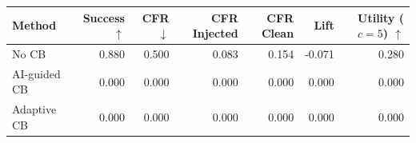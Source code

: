 \begin{tabular}{lrrrrrr}
\toprule
Method & Success $\uparrow$ & CFR $\downarrow$ & CFR Injected & CFR Clean & Lift & Utility ($c=5$) $\uparrow$ \\
\midrule
No CB & 0.880 & 0.500 & 0.083 & 0.154 & -0.071 & 0.280 \\
AI-guided CB & 0.000 & 0.000 & 0.000 & 0.000 & 0.000 & 0.000 \\
Adaptive CB & 0.000 & 0.000 & 0.000 & 0.000 & 0.000 & 0.000 \\
\bottomrule
\end{tabular}
